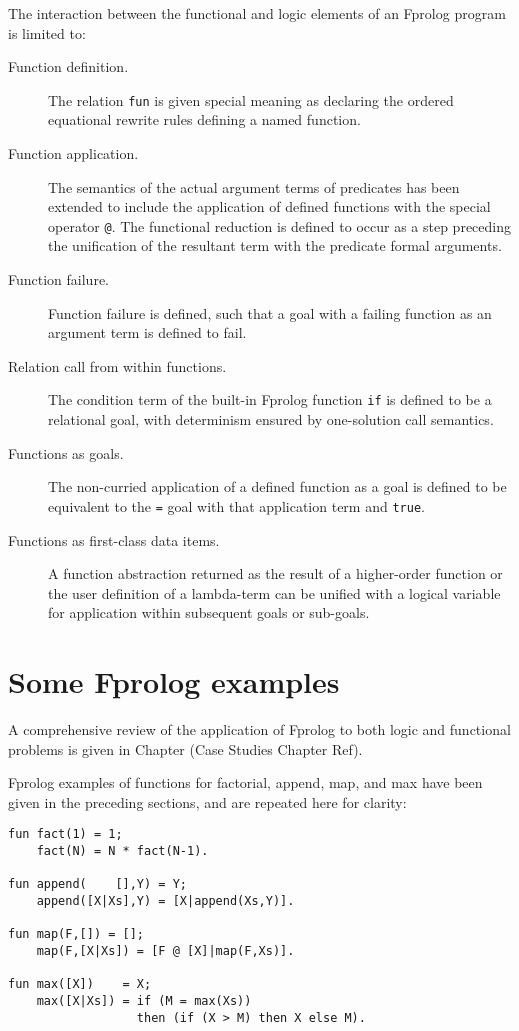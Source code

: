 \documentclass[a4paper,11pt,twoside]{article}
\begin{document}
The interaction between the functional and logic elements of an Fprolog
program is limited to:
\begin{description}
\item[Function definition.]{The relation \texttt{fun} is given special meaning as
  declaring the ordered equational rewrite rules defining a named function.}
\item[Function application.]{The semantics of the actual argument
  terms of predicates has been extended to
  include the application of defined functions
  with the special operator \texttt{@}.  The functional reduction
  is defined to occur as a step preceding the unification of the resultant term
  with the predicate formal arguments.}
\item[Function failure.]{Function failure is defined, such that a goal with a failing
  function as an argument term is defined to fail.}
\item[Relation call from within functions.]{The condition term of the built-in
  Fprolog function \texttt{if} is defined to be a relational goal, with determinism
  ensured by one-solution call semantics.}
\item[Functions as goals.]{The non-curried application of a defined function as a goal is
  defined to be equivalent to the \texttt{=} goal with that application term and
  \texttt{true}.}
\item[Functions as first-class data items.]{A function abstraction returned as the
  result of a higher-order function or the user definition of a lambda-term can be
  unified with a logical variable for application within subsequent goals or sub-goals.}
\end{description}

\section{Some Fprolog examples} %

A comprehensive review of the application of Fprolog to both logic and functional
problems is given in Chapter (Case Studies Chapter Ref).

Fprolog examples of functions for factorial, append, map, and max 
have been given in
the preceding sections, and are repeated here for clarity:
\begin{verbatim}
fun fact(1) = 1;
    fact(N) = N * fact(N-1).

fun append(    [],Y) = Y;
    append([X|Xs],Y) = [X|append(Xs,Y)].

fun map(F,[]) = [];
    map(F,[X|Xs]) = [F @ [X]|map(F,Xs)].

fun max([X])    = X;
    max([X|Xs]) = if (M = max(Xs))
                  then (if (X > M) then X else M).
\end{verbatim}
\end{document}
